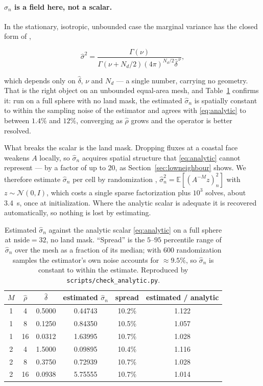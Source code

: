 \documentclass[11pt]{article}
\newcommand{\dhat}{\hat{\delta}}
\newcommand{\rhohat}{\hat{\rho}}
\newcommand{\shat}{\hat{\sigma}}
\newcommand{\Nd}{N_d}
\begin{document}
\paragraph{$\shat_n$ is a field here, not a scalar.} In the stationary, isotropic,
unbounded case the marginal variance has the closed form of \citet[Eq.~8]{smith2022},

\begin{equation}
\label{eq:analytic}
\shat^2 = \frac{\Gamma(\nu)}{\Gamma\!\left(\nu + \Nd/2\right)\left(4\pi\right)^{\Nd/2}\dhat^{\,\nu}},
\end{equation}

which depends only on $\dhat$, $\nu$ and $\Nd$ --- a single number, carrying no geometry.
That is the right object on an unbounded equal-area mesh, and Table~\ref{tab:analytic}
confirms it: run on a full sphere with no land mask, the estimated $\shat_n$ is spatially
constant to within the sampling noise of the estimator and agrees with \eqref{eq:analytic}
to between $1.4\%$ and $12\%$, converging as $\rhohat$ grows and the operator is better
resolved.

What breaks the scalar is the land mask. Dropping fluxes at a coastal face weakens $A$
locally, so $\shat_n$ acquires spatial structure that \eqref{eq:analytic} cannot represent
--- by a factor of up to $20$, as Section~\ref{sec:lowneighbour} shows. We therefore
estimate $\shat_n$ per cell by randomization \citep{weaver2021},
$\shat^2_n = \mathbb{E}[(A^{-M}z)_n^2]$ with $z \sim \mathcal{N}(0,I)$, which costs a
single sparse factorization plus $10^3$ solves, about \SI{3.4}{\second}, once at
initialization. Where the analytic scalar is adequate it is recovered automatically, so
nothing is lost by estimating.

\begin{table}[htbp]
\centering
\caption{Estimated $\shat_n$ against the analytic scalar \eqref{eq:analytic} on a full
sphere at $\mathrm{nside}=32$, no land mask. ``Spread'' is the $5$--$95$ percentile range
of $\shat_n$ over the mesh as a fraction of its median; with $600$ randomization samples
the estimator's own noise accounts for $\approx 9.5\%$, so $\shat_n$ is constant to within
the estimate. Reproduced by \texttt{scripts/check\_analytic.py}.}
\label{tab:analytic}
\begin{tabular}{cccccc}
\toprule
$M$ & $\rhohat$ & $\dhat$ & estimated $\shat_n$ & spread & estimated / analytic \\
\midrule
1 & 4  & 0.5000 & 0.44743 & 10.2\% & 1.122 \\
1 & 8  & 0.1250 & 0.84350 & 10.5\% & 1.057 \\
1 & 16 & 0.0312 & 1.63995 & 10.7\% & 1.028 \\
2 & 4  & 1.5000 & 0.09895 & 10.4\% & 1.116 \\
2 & 8  & 0.3750 & 0.72939 & 10.7\% & 1.028 \\
2 & 16 & 0.0938 & 5.75555 & 10.7\% & 1.014 \\
\bottomrule
\end{tabular}
\end{table}
\end{document}
